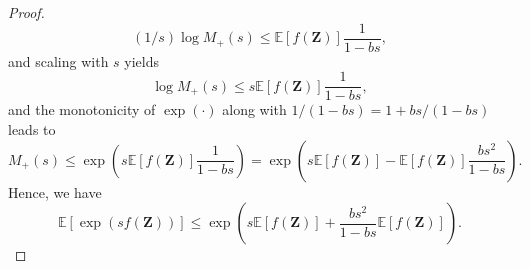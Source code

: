 \documentclass[10pt,a4paper]{amsart}
\newcommand{\E}{\mathbb{E}}
\newcommand{\bZ}{\boldsymbol{Z}}
\begin{document}
\begin{proof}
\begin{equation*}
    (1/s)\log M_{+}(s)\le \E[f(\bZ)]\frac{1}{1-bs},
\end{equation*}
and scaling with $s$ yields
\begin{equation*}
    \log M_{+}(s)\le s\E[f(\bZ)]\frac{1}{1-bs},
\end{equation*}
and the monotonicity of $\exp(\cdot)$ along with $1/(1-bs)=1+bs/(1-bs)$ leads to
\begin{equation*}
    M_{+}(s)\le \exp\left(s\E[f(\bZ)]\frac{1}{1-bs}\right)=\exp\left(s\E[f(\bZ)]-\E[f(\bZ)]\frac{bs^{2}}{1-bs}\right).
\end{equation*}
Hence, we have
\begin{equation*}
    \E[\exp(sf(\bZ))]\le \exp\left(s\E[f(\bZ)]+\frac{bs^{2}}{1-bs}\E[f(\bZ)]\right).
\end{equation*}


\end{proof}
\end{document}
